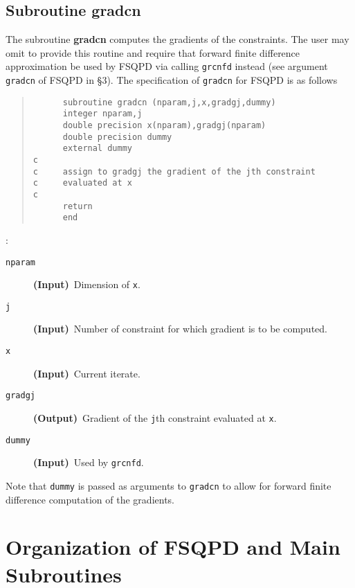 \subsection{Subroutine gradcn}
The subroutine {\bf gradcn} computes the gradients of the constraints. 
The user may omit to provide this routine and require that forward 
finite difference approximation be used by FSQPD via 
calling {\tt grcnfd} instead (see argument {\tt gradcn} of FSQPD in \S 3).
The specification of {\tt gradcn} for FSQPD is as follows
\begin{quote}
\begin{verbatim}
      subroutine gradcn (nparam,j,x,gradgj,dummy)
      integer nparam,j
      double precision x(nparam),gradgj(nparam)
      double precision dummy
      external dummy
c
c     assign to gradgj the gradient of the jth constraint
c     evaluated at x
c
      return
      end
\end{verbatim}
\end{quote}
:
\begin{description}
\item[\tt nparam]  {\bf (Input)}~Dimension of {\tt x}.
\item[\tt j]     {\bf (Input)}~Number of constraint for which
                               gradient is to be computed. 
\item[\tt x]       {\bf (Input)}~Current iterate.
\item[\tt gradgj]   {\bf (Output)}~Gradient of the {\tt j}th
                    constraint evaluated at {\tt x}.
\item[\tt dummy]  {\bf (Input)}~Used by {\tt grcnfd}.
\end{description}

\noindent Note that {\tt  dummy} is passed as arguments
to {\tt gradcn} to allow for forward finite difference 
computation of the gradients.

\section{Organization of FSQPD and Main Subroutines}
